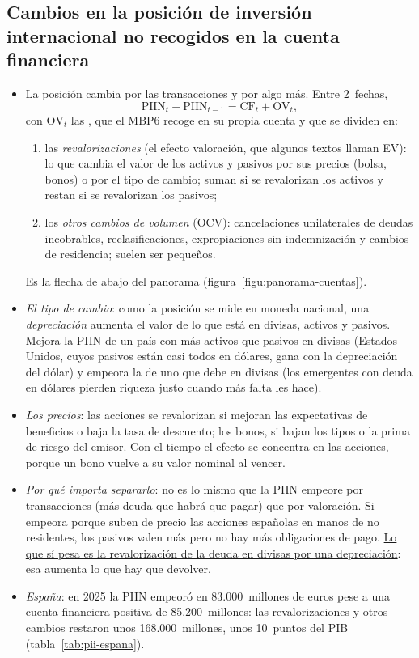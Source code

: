 \documentclass[11pt]{article}
\begin{document}
\subsection{Cambios en la posición de inversión internacional no recogidos en la cuenta financiera}\label{sec:otras-variaciones}

\begin{itemize}
\item La posición cambia por las transacciones y por algo más. Entre 2~fechas,
\begin{equation}\label{eq:variacion-pii}
\mathrm{PIIN}_t-\mathrm{PIIN}_{t-1}=\mathrm{CF}_t+\mathrm{OV}_t ,
\end{equation}
con $\mathrm{OV}_t$ las , que el MBP6 recoge en su propia cuenta y que se dividen en\nocite{FMI2009MBP6}:
  \begin{enumerate}
  \item las \emph{revalorizaciones} (el efecto valoración, que algunos textos llaman EV): lo que cambia el valor de los activos y pasivos por sus precios (bolsa, bonos) o por el tipo de cambio; suman si se revalorizan los activos y restan si se revalorizan los pasivos;
  \item los \emph{otros cambios de volumen} (OCV): cancelaciones unilaterales de deudas incobrables, reclasificaciones, expropiaciones sin indemnización y cambios de residencia; suelen ser pequeños.
  \end{enumerate}
  Es la flecha de abajo del panorama (figura~\ref{figu:panorama-cuentas}).
\item \emph{El tipo de cambio}: como la posición se mide en moneda nacional, una \emph{depreciación} aumenta el valor de lo que está en divisas, activos y pasivos. Mejora la PIIN de un país con más activos que pasivos en divisas (Estados Unidos, cuyos pasivos están casi todos en dólares, gana con la depreciación del dólar) y empeora la de uno que debe en divisas (los emergentes con deuda en dólares pierden riqueza justo cuando más falta les hace).
\item \emph{Los precios}: las acciones se revalorizan si mejoran las expectativas de beneficios o baja la tasa de descuento; los bonos, si bajan los tipos o la prima de riesgo del emisor. Con el tiempo el efecto se concentra en las acciones, porque un bono vuelve a su valor nominal al vencer.
\item \emph{Por qué importa separarlo}: no es lo mismo que la PIIN empeore por transacciones (más deuda que habrá que pagar) que por valoración. Si empeora porque suben de precio las acciones españolas en manos de no residentes, los pasivos valen más pero no hay más obligaciones de pago. \uline{Lo que sí pesa es la revalorización de la deuda en divisas por una depreciación}: esa aumenta lo que hay que devolver\nocite{LaneMilesiFerretti2007}.
\item \emph{España}: en 2025 la PIIN empeoró en 83.000~millones de euros pese a una cuenta financiera positiva de 85.200~millones: las revalorizaciones y otros cambios restaron unos 168.000~millones, unos 10~puntos del PIB (tabla~\ref{tab:pii-espana})\nocite{BdE2026BE17,BdE2026BP2025}.
\end{itemize}
\end{document}
